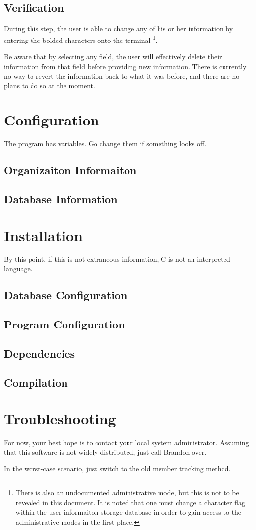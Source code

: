 \documentclass[12pt]{article}
\begin{document}
\subsection{Verification}
During this step, the user is able to change any of his or her information by
entering the bolded characters onto the terminal
\footnote{There is also an undocumented administrative mode, but this is not
to be revealed in this document.  It is noted that one must change a
character flag within the user informaiton storage database in order to gain
access to the administrative modes in the first place.}.

Be aware that by selecting any field, the user will effectively delete their
information from that field before providing new information.
There is currently no way to revert the information back to what it was
before, and there are no plans to do so at the moment.

\section{Configuration}
The program has variables.  Go change them if something looks off.

\subsection{Organizaiton Informaiton}

\subsection{Database Information}

\section{Installation}
By this point, if this is not extraneous information, C is not an interpreted
language.
\subsection{Database Configuration}

\subsection{Program Configuration}

\subsection{Dependencies}

\subsection{Compilation}

\section{Troubleshooting}
For now, your best hope is to contact your local system administrator.
Assuming that this software is not widely distributed, just call Brandon over.

In the worst-case scenario, just switch to the old member tracking method.
\end{document}
